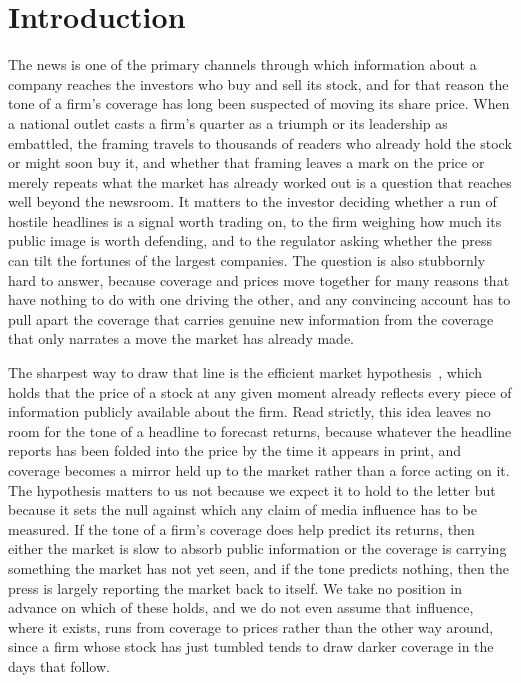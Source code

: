 \documentclass[conference]{IEEEtran}
\begin{document}
\section{Introduction}
The news is one of the primary channels through which information about a company
reaches the investors who buy and sell its stock, and for that reason the tone of a
firm's coverage has long been suspected of moving its share price. When a national
outlet casts a firm's quarter as a triumph or its leadership as embattled, the framing
travels to thousands of readers who already hold the stock or might soon buy it, and
whether that framing leaves a mark on the price or merely repeats what the market has
already worked out is a question that reaches well beyond the newsroom. It matters to
the investor deciding whether a run of hostile headlines is a signal worth trading on,
to the firm weighing how much its public image is worth defending, and to the regulator
asking whether the press can tilt the fortunes of the largest companies. The question
is also stubbornly hard to answer, because coverage and prices move together for many
reasons that have nothing to do with one driving the other, and any convincing account
has to pull apart the coverage that carries genuine new information from the coverage
that only narrates a move the market has already made.

The sharpest way to draw that line is the efficient market hypothesis~\cite{fama1970},
which holds that the price of a stock at any given moment already reflects every piece
of information publicly available about the firm. Read strictly, this idea leaves no
room for the tone of a headline to forecast returns, because whatever the headline
reports has been folded into the price by the time it appears in print, and coverage
becomes a mirror held up to the market rather than a force acting on it. The hypothesis
matters to us not because we expect it to hold to the letter but because it sets the
null against which any claim of media influence has to be measured. If the tone of a
firm's coverage does help predict its returns, then either the market is slow to absorb
public information or the coverage is carrying something the market has not yet seen,
and if the tone predicts nothing, then the press is largely reporting the market back to
itself. We take no position in advance on which of these holds, and we do not even
assume that influence, where it exists, runs from coverage to prices rather than the
other way around, since a firm whose stock has just tumbled tends to draw darker
coverage in the days that follow.
\end{document}
